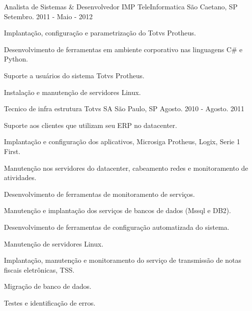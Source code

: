 \begin{cventries}
\cventry
  {Analista de Sistemas \& Desenvolvedor} %
  {IMP TeleInformatica} %
  {São Caetano, SP} %
  {Setembro. 2011 - Maio - 2012} %
  {
    \begin{cvitems} %
        \item {Implantação, configuração e parametrização do Totvs Protheus.}
        \item {Desenvolvimento de ferramentas em ambiente corporativo nas linguagens C\# e Python. }
        \item {Suporte a usuários do sistema Totvs Protheus. }
        \item {Instalação e manutenção de servidores Linux.}
    \end{cvitems}
  }

\cventry
{Tecnico de infra estrutura} %
{Totvs SA} %
{São Paulo, SP} %
{Agosto. 2010 - Agosto. 2011} %
{
  \begin{cvitems} %
      \item {Suporte aos clientes que utilizam seu ERP no datacenter.}
      \item {Implantação e configuração dos aplicativos, Microsiga Protheus, Logix, Serie 1 First.}
      \item {Manutenção nos servidores do datacenter, cabeamento redes e monitoramento de atividades.}
      \item {Desenvolvimento de ferramentas de monitoramento de serviços.}
      \item {Manutenção e implantação dos serviços de bancos de dados (Mssql e DB2).}
      \item {Desenvolvimento de ferramentas de configuração automatizada do sistema.}
      \item {Manutenção de servidores Linux.}
      \item {Implantação, manutenção e monitoramento do serviço de transmissão de notas fiscais eletrônicas, TSS.}
      \item {Migração de banco de dados.}
      \item {Testes e identificação de erros.}
  \end{cvitems}
}

\end{cventries}
